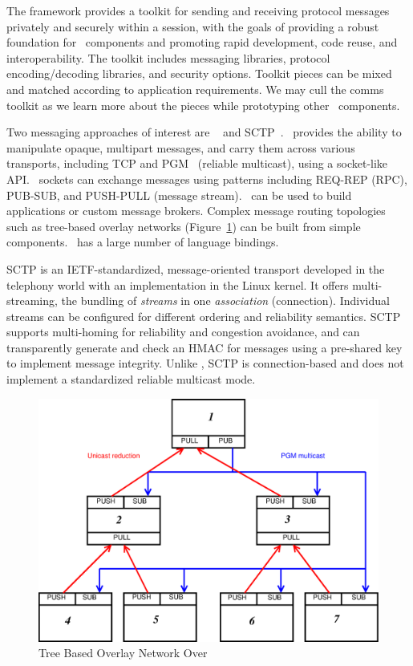 The framework provides a toolkit for sending and receiving
protocol messages privately and securely within a session,
with the goals of providing a robust foundation for \ngrm\ components
and promoting rapid development, code reuse, and interoperability.
The toolkit includes messaging libraries,
protocol encoding/decoding libraries, and security options.
Toolkit pieces can be mixed and matched according to application
requirements.  We may cull the comms toolkit as we learn more
about the pieces while prototyping other \ngrm\ components.

Two messaging approaches of interest are \zMQ~\cite{ZMQGuide} and
SCTP~\cite{SCTP}.
\zMQ\ provides the ability to manipulate opaque, multipart messages,
and carry them across various transports, including TCP and
PGM~\cite{rfc3208} (reliable multicast), using a socket-like API.
\zMQ\ sockets can exchange messages using patterns including
REQ-REP (RPC), PUB-SUB, and PUSH-PULL (message stream).
\zMQ\ can be used to build applications or custom message brokers.
Complex message routing topologies such as tree-based overlay networks
(Figure~\ref{FigZmqTBON}) can be built from simple components.
\zMQ\ has a large number of language bindings.

SCTP is an IETF-standardized, message-oriented transport developed
in the telephony world with an implementation in the Linux kernel.
It offers multi-streaming, the bundling of {\em streams} in one
{\em association} (connection).  Individual streams can be configured for
different ordering and reliability semantics.  SCTP supports
multi-homing for reliability and congestion avoidance, and
can transparently generate and check an HMAC for messages using a
pre-shared key to implement message integrity.  Unlike \zMQ, SCTP is
connection-based and does not implement a standardized reliable multicast
mode.

\begin{figure}
\centering
\includegraphics[scale=0.35]{../fig/zmqtbon.eps}
\caption{Tree Based Overlay Network Over \zMQ}
\label{FigZmqTBON}
\end{figure}

